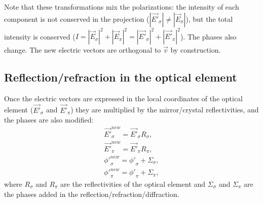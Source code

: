 \documentclass{iucr}
\begin{document}





Note that these transformations mix the polarizations: the intensity of each component is not conserved in the projection ($|\vec{E'}_\sigma| \ne |\vec{E}_\sigma|$),
but the total intensity is conserved ($I=|\vec{E}_\sigma|^2+|\vec{E}_\pi|^2=
|\vec{E'}_\sigma|^2+|\vec{E'}_\pi|^2$). The phases also change.
The new electric vectors are orthogonal to $\vec{v}$ by construction.

\subsection{Reflection/refraction in the optical element}
\label{sec:reflection}

Once the electric vectors are expressed in the local coordinates of the optical element ($\vec{E'}_\sigma$ and 
$\vec{E'}_\pi$) they are multiplied by the mirror/crystal reflectivities, and the phases are also modified:
\begin{eqnarray}
 \label{reflectivities}
 \vec{E'}_\sigma^{new} = \vec{E'}_\sigma R_\sigma, \nonumber \\
 \vec{E'}_\pi^{new} = \vec{E'}_\pi R_\pi, \nonumber \\
 {\phi '}_\sigma^{new} = {\phi '}_\sigma + \Sigma_\sigma, \nonumber \\
 {\phi '}_\pi^{new} = {\phi '}_\pi + \Sigma_\pi,
\end{eqnarray}
where $R_\sigma$ and $R_\pi$ are the reflectivities of the optical element and $\Sigma_\sigma$ and $\Sigma_\pi$ are the phases added in the reflection/refraction/diffraction. 
\end{document}
